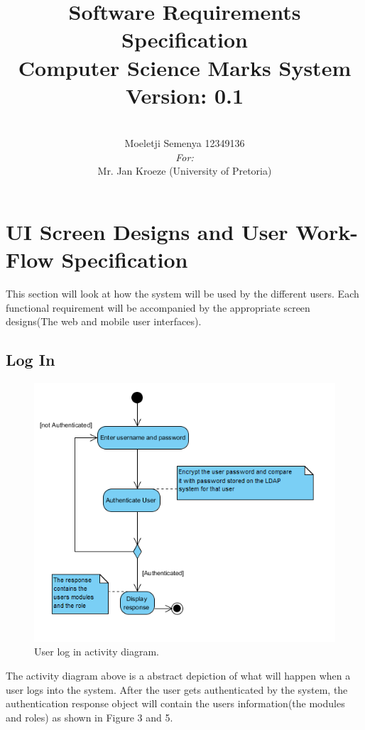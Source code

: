 \documentclass[11pt,a4paper]{article}
\begin{document}
\begin{titlepage}
\title{\textbf{Software Requirements Specification}\\Computer Science Marks System\\ \small Version: 0.1\\ }

\author{\\Moeletji Semenya 12349136\\
\textit{For:} \\Mr. Jan Kroeze (University of Pretoria)}



\maketitle
\end{titlepage}
\pagebreak
\tableofcontents
\pagebreak
\section{UI Screen Designs and User Work-Flow Specification}
This section will look at how the system will be used by the different users. Each functional requirement will be accompanied by the appropriate screen designs(The web and mobile user interfaces). 
\subsection{Log In}
		\begin{figure}[h]
		\centering
		\includegraphics[width=0.7\linewidth]{./uml_login}
		\caption{User log in activity diagram.}
		\label{fig:uml_login}
		\end{figure}

The activity diagram above is a abstract depiction of what will happen when a user logs into the system. After the user gets authenticated by the system, the authentication response object will contain the users information(the modules and roles) as shown in Figure 3 and 5.
\end{document}
